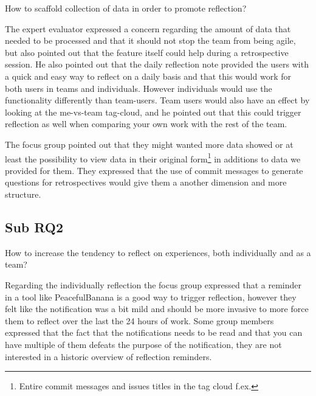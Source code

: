 \begin{center}
    How to scaffold collection of data in order to promote reflection? 
\end{center}

\noindent\makebox[\linewidth]{\rule{\textwidth}{0.5pt}} 
The expert evaluator expressed a concern regarding the amount of data that needed to be processed and that it should not stop the team from being agile, but also pointed out that the feature itself could help during a retrospective session. He also pointed out that the daily reflection note provided the users with a quick and easy way to reflect on a daily basis and that this would work for both users in teams and individuals. However individuals would use the functionality differently than team-users. Team users would also have an effect by looking at the me-vs-team tag-cloud, and he pointed out that this could trigger reflection as well when comparing your own work with the rest of the team.

The focus group pointed out that they might wanted more data showed or at least the possibility to view data in their original form\footnote{Entire commit messages and issues titles in the tag cloud f.ex.} in additions to data we provided for them. They expressed that the use of commit messages to generate questions for retrospectives would give them a another dimension and more structure.

\subsection{Sub RQ2}
\noindent\makebox[\linewidth]{\rule{\textwidth}{0.5pt}} 

\begin{center}
How to increase the tendency to reflect on experiences, both individually and as a team? \\
\end{center}  

\noindent\makebox[\linewidth]{\rule{\textwidth}{0.5pt}}
Regarding the individually reflection the focus group expressed that a reminder in a tool like PeacefulBanana is a good way to trigger reflection, however they felt like the notification was a bit mild and should be more invasive to more force them to reflect over the last the 24 hours of work. Some group members expressed that the fact that the notifications needs to be read and that you can have multiple of them defeats the purpose of the notification, they are not interested in a historic overview of reflection reminders. 

